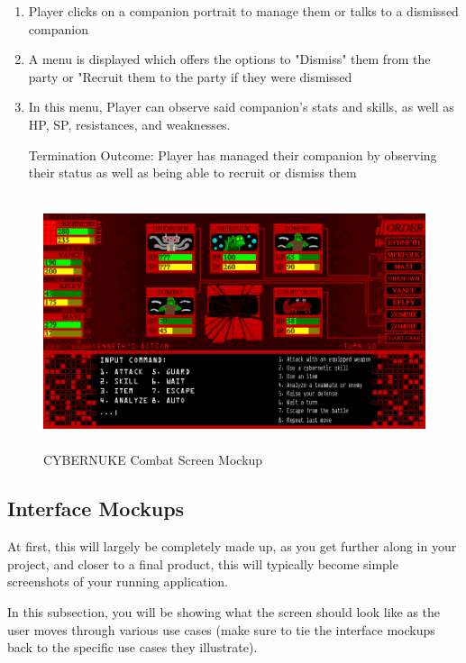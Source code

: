 \documentclass[10pt,conference,onecolumn,compsoc]{IEEEtran}
\begin{document}
\begin{enumerate}
\item Player clicks on a companion portrait to manage them or talks to a dismissed companion
\item A menu is displayed which offers the options to "Dismiss" them from the party or "Recruit them to the party if they were dismissed
\item In this menu, Player can observe said companion's stats and skills, as well as HP, SP, resistances, and weaknesses.
\item [Termination Outcome:] Player has managed their companion by observing their status as well as being able to recruit or dismiss them
\end{enumerate}

\begin{figure}[ht!]
\centering
\includegraphics[height=281.25px, width=500px]{Mockups/CYBERNUKE_COMBAT_MOCKUP.png}
\caption{CYBERNUKE Combat Screen Mockup}
\label{combat_mockup}
\end{figure}

\subsection{Interface Mockups}
At first, this will largely be completely made up, as you get further along in your project, and closer to a final product, this will typically become simple screenshots of your running application.

In this subsection, you will be showing what the screen should look like as the user moves through various use cases (make sure to tie the interface mockups back to the specific use cases they illustrate).



\end{document}
